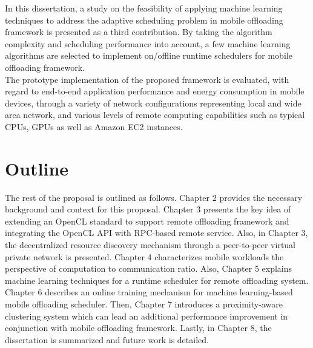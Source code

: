 %
In this dissertation, a study on the feasibility of applying machine
learning techniques to address the adaptive scheduling problem in mobile
offloading framework is presented as a third contribution.
%
By taking the algorithm complexity and scheduling performance into
account, a few machine learning algorithms are selected to implement
on/offline runtime schedulers for mobile offloading framework.\\
%
The prototype implementation of the proposed framework is evaluated,
with regard to end-to-end application performance and energy consumption
in mobile devices, through a variety of network configurations
representing local and wide area network, and various levels of remote
computing capabilities such as typical CPUs, GPUs as well as Amazon EC2
instances.
%
\section{Outline}
\label{intro:outline}
The rest of the proposal is outlined as follows.
%
Chapter 2 provides the necessary background and context for this
proposal.
%
Chapter 3 presents the key idea of extending an OpenCL standard to
support remote offloading framework and integrating the OpenCL API with
RPC-based remote service.
%
Also, in Chapter 3, the decentralized resource discovery mechanism
through a peer-to-peer virtual private network is presented.
%
Chapter 4 characterizes mobile workloads the perspective of computation
to communication ratio.
%
Also, Chapter 5 explains machine learning techniques for a runtime
scheduler for remote offloading system.
%
Chapter 6 describes an online training mechanism for machine
learning-based mobile offloading scheduler.
%
Then, Chapter 7 introduces a proximity-aware clustering system which can
lead an additional performance improvement in conjunction with mobile
offloading framework.
%
Lastly, in Chapter 8, the dissertation is summarized and future work
is detailed.
%
